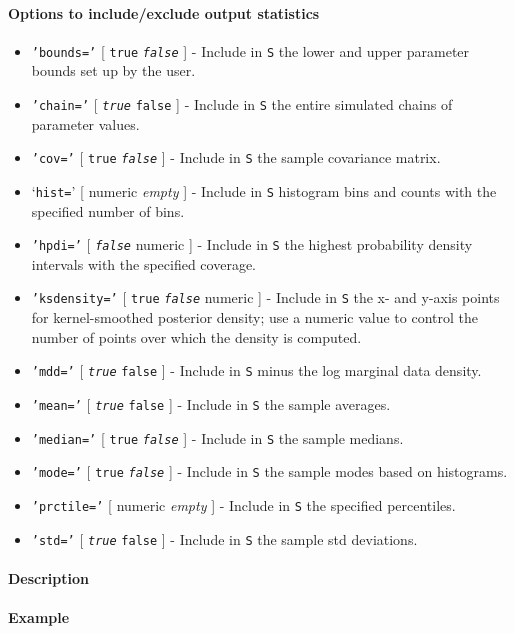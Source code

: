 \paragraph{Options to include/exclude output
statistics}

\begin{itemize}
\item
  \texttt{'bounds='} {[} \texttt{true} \textbar{} \emph{\texttt{false}}
  {]} - Include in \texttt{S} the lower and upper parameter bounds set
  up by the user.
\item
  \texttt{'chain='} {[} \emph{\texttt{true}} \textbar{} \texttt{false}
  {]} - Include in \texttt{S} the entire simulated chains of parameter
  values.
\item
  \texttt{'cov='} {[} \texttt{true} \textbar{} \emph{\texttt{false}} {]}
  - Include in \texttt{S} the sample covariance matrix.
\item
  `\texttt{hist=}' {[} numeric \textbar{} \emph{empty} {]} - Include in
  \texttt{S} histogram bins and counts with the specified number of
  bins.
\item
  \texttt{'hpdi='} {[} \emph{\texttt{false}} \textbar{} numeric {]} -
  Include in \texttt{S} the highest probability density intervals with
  the specified coverage.
\item
  \texttt{'ksdensity='} {[} \texttt{true} \textbar{}
  \emph{\texttt{false}} \textbar{} numeric {]} - Include in \texttt{S}
  the x- and y-axis points for kernel-smoothed posterior density; use a
  numeric value to control the number of points over which the density
  is computed.
\item
  \texttt{'mdd='} {[} \emph{\texttt{true}} \textbar{} \texttt{false} {]}
  - Include in \texttt{S} minus the log marginal data density.
\item
  \texttt{'mean='} {[} \emph{\texttt{true}} \textbar{} \texttt{false}
  {]} - Include in \texttt{S} the sample averages.
\item
  \texttt{'median='} {[} \texttt{true} \textbar{} \emph{\texttt{false}}
  {]} - Include in \texttt{S} the sample medians.
\item
  \texttt{'mode='} {[} \texttt{true} \textbar{} \emph{\texttt{false}}
  {]} - Include in \texttt{S} the sample modes based on histograms.
\item
  \texttt{'prctile='} {[} numeric \textbar{} \emph{empty} {]} - Include
  in \texttt{S} the specified percentiles.
\item
  \texttt{'std='} {[} \emph{\texttt{true}} \textbar{} \texttt{false} {]}
  - Include in \texttt{S} the sample std deviations.
\end{itemize}

\paragraph{Description}

\paragraph{Example}


